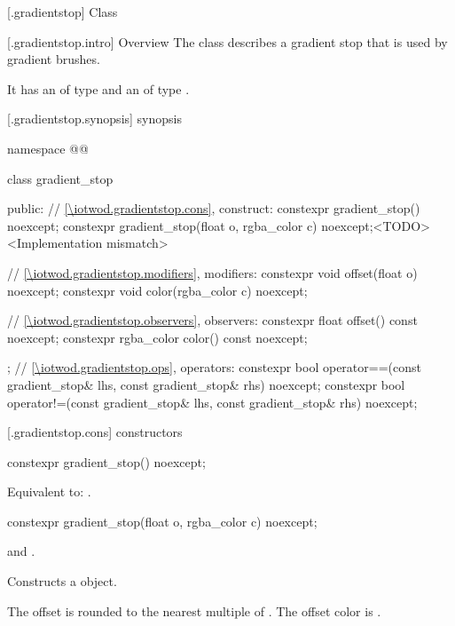  [\iotwod.gradientstop] {Class }

 [\iotwod.gradientstop.intro] {Overview}
\pnum
{}%
The class  describes a gradient stop that is used by gradient brushes.

\pnum
It has an  of type  and an  of type .

 [\iotwod.gradientstop.synopsis] { synopsis}

\begin{codeblock}
namespace @\fullnamespace{}@ {
  class gradient_stop {
  public:
    // \ref{\iotwod.gradientstop.cons}, construct:
    constexpr gradient_stop() noexcept;
    constexpr gradient_stop(float o, rgba_color c) noexcept;<TODO><Implementation mismatch>
    
    // \ref{\iotwod.gradientstop.modifiers}, modifiers:
    constexpr void offset(float o) noexcept;
    constexpr void color(rgba_color c) noexcept;
	
    // \ref{\iotwod.gradientstop.observers}, observers:
    constexpr float offset() const noexcept;
    constexpr rgba_color color() const noexcept;
  };
  // \ref{\iotwod.gradientstop.ops}, operators:
  constexpr bool operator==(const gradient_stop& lhs, const gradient_stop& rhs)
    noexcept;
  constexpr bool operator!=(const gradient_stop& lhs, const gradient_stop& rhs)
    noexcept;
}
\end{codeblock}

 [\iotwod.gradientstop.cons] { constructors}

%
\begin{itemdecl}
constexpr gradient_stop() noexcept;
\end{itemdecl}
\begin{itemdescr}
\pnum
\effects
Equivalent to: .
\end{itemdescr}

%
\begin{itemdecl}
constexpr gradient_stop(float o, rgba_color c) noexcept;
\end{itemdecl}
\begin{itemdescr}
\pnum
\requires
{} and .

\pnum
\effects
Constructs a  object.

\pnum
The offset is  rounded to the nearest multiple of . The offset color is .
\end{itemdescr}

